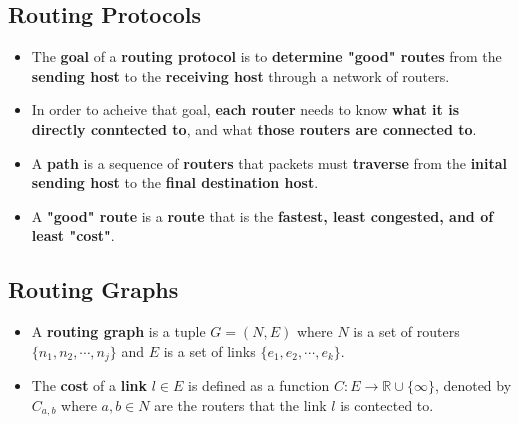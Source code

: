 \documentclass{article}
\begin{document}
    \subsection*{Routing Protocols}
    \begin{itemize}
        \item The \textbf{goal} of a \textbf{routing protocol} is to \textbf{determine "good" routes} from the \textbf{sending host} to the \textbf{receiving host} through a network of routers.
        \item In order to acheive that goal, \textbf{each router} needs to know \textbf{what it is directly conntected to}, and what \textbf{those routers are connected to}.
        \item A \textbf{path} is a sequence of \textbf{routers} that packets must \textbf{traverse} from the \textbf{inital sending host} to the \textbf{final destination host}.
        \item A \textbf{"good" route} is a \textbf{route} that is the \textbf{fastest, least congested, and of least "cost"}.
    \end{itemize}

    \subsection*{Routing Graphs}
    \begin{itemize}
        \item A \textbf{routing graph} is a tuple $G=(N, E)$ where $N$ is a set of routers $\{n_1, n_2, \cdots, n_j\}$ and $E$ is a set of links $\{e_1, e_2, \cdots, e_k\}$.
        \item The \textbf{cost} of a \textbf{link} $l\in{E}$ is defined as a function $C: E\rightarrow\mathbb{R}\cup\{\infty\}$, denoted by $C_{a,b}$ where $a,b\in{N}$ are the routers that the link $l$ is contected to.
    \end{itemize}
\end{document}
